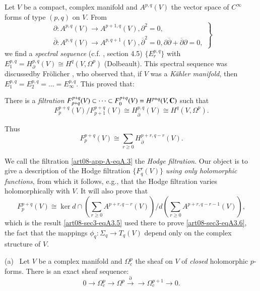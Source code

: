 Let $V$ be a compact, complex manifold and $A^{p,q}(V)$ the vector space of $C^{\infty}$ forms of type $(p,q)$ on $V$. From
\setcounter{equation}{0}
\begin{equation*}
\left.
\begin{array}{l}
\partial : A^{p,q}(V)\to A^{p+1,q}(V), \partial^{2}=0,\\
\overline{\partial} : A^{p,q}(V)\to A^{p,q+1}(V), \overline{\partial}^{2}=0, \partial\overline{\partial}+\overline{\partial}\partial=0,
\end{array}\right\}\tag{A.1}\label{art08-app-A-eqA.1}
\end{equation*}
we find a {\em spectral sequence} (c.f. \cite{art08-key7}, section 4.5) $\{E^{p,q}_{r}\}$ with $E^{p,q}_{1}=H^{p,q}_{\partial}(V)\cong H^{q}(V,\Omega^{p})$ (Dolbeault). This spectral sequence was discussed\pageoriginale by Fr\"olicher \cite{art08-key6}, who observed that, if $V$ was a {\em K\"ahler manifold}, then $E^{p,q}_{1}=E^{p,q}_{2}=\ldots=E^{p,q}_{\infty}$. This proved that:

There is a {\em filtration} $F^{p+q}_{p+q}(V)\subset\cdots\subset F^{p+q}_{0}(V)=H^{p+q}(V,\mathbf{C})$ such that 
\begin{equation*}
F^{p+q}_{p}(V)/F^{p+q}_{p+1}(V)\cong H^{p,q}_{\overline{\partial}}(V)\cong H^{q}(V,\Omega^{p}).\tag{A.2}\label{art08-app-A-eqA.2}
\end{equation*}

Thus
\begin{equation*}
F^{p+q}_{p}(V)\cong \sum\limits_{r\geq 0}H^{p+r,q-r}_{\overline{\partial}}(V).\tag{A.3}\label{art08-app-A-eqA.3}
\end{equation*}

We call the filtration \eqref{art08-app-A-eqA.3} the {\em Hodge filtration}. Our object is to give a description of the Hodge filtration $\{F^{r}_{q}(V)\}$ {\em using only holomorphic functions}, from which it follows, e.g., that the Hodge filtration varies holomorphically with $V$. It will also prove that 
\begin{equation*}
F^{p+q}_{p}(V)\cong \ker d\cap \left(\sum\limits_{r\geq 0}A^{p+r,q-r}(V)\right)/ d\left(\sum\limits_{r\geq 0}A^{p+r,q-r-1}(V)\right),\tag{A.4}\label{art08-app-A-eqA.4}
\end{equation*}
which is the result \eqref{art08-sec3-eqA3.5} used there to prove \eqref{art08-sec3-eqA3.6}, the fact that the mappings $\phi_{q}:\Sigma_{q}\to T_{q}(V)$ depend only on the complex structure of $V$.

(a)~ Let $V$ be a complex manifold and $\Omega^{p}_{c}$ the sheaf on $V$ of {\em closed} holomorphic $p$-forms. There is an exact sheaf sequence:
\begin{equation*}
0\to \Omega^{p}_{c}\to \Omega^{p}\xrightarrow{\partial}\to \Omega^{p+1}_{c}\to 0.\tag{A.5}\label{art08-app-A-eqA.5}
\end{equation*}


